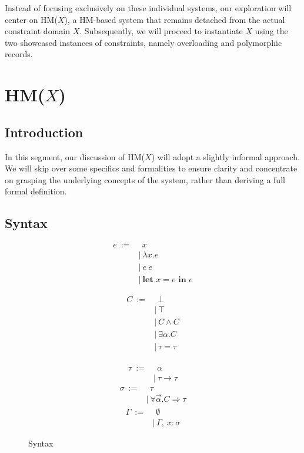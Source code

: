 \documentclass[runningheads]{llncs}
\newcommand{\hmx}{HM($X$)}
\newcommand{\kwlet}{\textbf{let }}
\newcommand{\kwin}{\textbf{ in }}
\begin{document}
Instead of focusing exclusively on these individual systems, our exploration
will center on \hmx{}, a HM-based system that remains detached from
the actual constraint domain $X$.
Subsequently, we will proceed to instantiate $X$ using the two showcased
instances of constraints, namely overloading and polymorphic records.
\section{\hmx{}}
\subsection{Introduction}
In this segment, our discussion of \hmx{} will adopt a slightly informal
approach.
We will skip over some specifics and formalities to ensure clarity and
concentrate on
grasping the underlying concepts of the system, rather than deriving a full
formal definition.
\subsection{Syntax}
\begin{figure}[t]
  \centering
  \begin{subfigure}[t]{0.3\textwidth}
    \begin{align*}
      e \ := & \ \ x                    \\
             & | \ λx. e                \\
             & | \ e \ e                \\
             & | \ \kwlet x = e \kwin e
    \end{align*}
  \end{subfigure}
  \begin{subfigure}[t]{0.3\textwidth}
    \begin{align*}
      C \ := & \ \ ⊥     \\
             & | \ ⊤     \\
             & | \ C ∧ C \\
             & | \ ∃α. C \\
             & | \ τ = τ \\
    \end{align*}
  \end{subfigure}
  \begin{subfigure}[t]{0.3\textwidth}
    \begin{align*}
      τ \ := & \ \ α     \\
             & | \ τ → τ
    \end{align*}
    \begin{align*}
      σ \ := & \ \ τ             \\
             & | \ ∀\Vec α.C ⇒ τ
    \end{align*}
    \begin{align*}
      Γ \ := & \ \ ∅           \\
             & | \ Γ , \ x : σ
    \end{align*}
  \end{subfigure}
  \caption{Syntax}
\end{figure}
\end{document}
